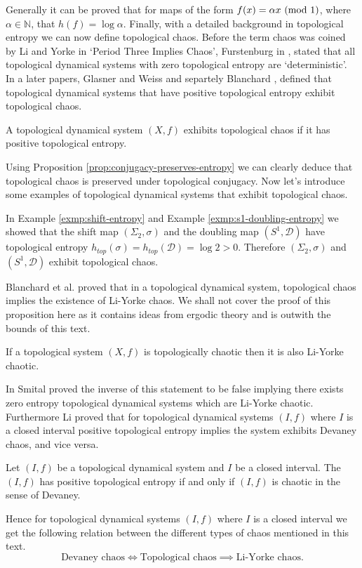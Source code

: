 Generally it can be proved that for maps of the form $f(x) = \alpha x \ (\mathrm{mod}\ 1)$, where $\alpha \in \mathbb{N}$, that $h(f) = \log \alpha$. Finally, with a detailed background in topological entropy we can now define topological chaos. Before the term chaos was coined by Li and Yorke in `Period Three Implies Chaos', Furstenburg in \cite{furstenberg}, stated that all topological dynamical systems with zero topological entropy are `deterministic'. In a later papers, Glasner and Weiss \cite{glasner-weiss} and separtely Blanchard \cite{blanchard}, defined that topological dynamical systems that have positive topological entropy exhibit topological chaos.

\begin{defn}
    A topological dynamical system $(X, f)$ exhibits topological chaos if it has positive topological entropy.
\end{defn}

Using Proposition \ref{prop:conjugacy-preserves-entropy} we can clearly deduce that topological chaos is preserved under topological conjugacy. Now let's introduce some examples of topological dynamical systems that exhibit topological chaos.

\begin{exmp}
    In Example \ref{exmp:shift-entropy} and Example \ref{exmp:s1-doubling-entropy} we showed that the shift map $(\Sigma_2, \sigma)$ and the doubling map $(S^1, \mathcal{D})$ have topological entropy $h_{top}(\sigma) = h_{top}(\mathcal{D}) = \log 2 > 0$. Therefore $(\Sigma_2, \sigma)$ and $(S^1, \mathcal{D})$ exhibit topological chaos.
\end{exmp}

Blanchard et al. \cite{bgsm} proved that in a topological dynamical system, topological chaos implies the existence of Li-Yorke chaos. We shall not cover the proof of this proposition here as it contains ideas from ergodic theory and is outwith the bounds of this text.

\begin{prop}
    If a topological system $(X, f)$ is topologically chaotic then it is also Li-Yorke chaotic.
\end{prop}

In \cite{smital} Smital proved the inverse of this statement to be false implying there exists zero entropy topological dynamical systems which are Li-Yorke chaotic. Furthermore Li \cite{li} proved that for topological dynamical systems $(I, f)$ where $I$ is a closed interval positive topological entropy implies the system exhibits Devaney chaos, and vice versa.

\begin{prop}
    Let $(I, f)$ be a topological dynamical system and $I$ be a closed interval. The $(I, f)$ has positive topological entropy if and only if $(I, f)$ is chaotic in the sense of Devaney.
\end{prop}

Hence for topological dynamical systems $(I, f)$ where $I$ is a closed interval we get the following relation between the different types of chaos mentioned in this text. \[\text{Devaney chaos} \iff \text{Topological chaos} \implies\text{Li-Yorke chaos}.\]
